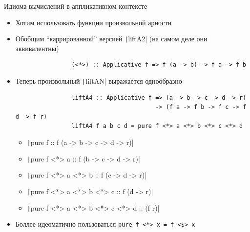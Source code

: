     \begin{frame}[fragile]{Идиома вычислений в аппликативном контексте}
        \vspace{-0.5em}
        \begin{itemize}
            \item Хотим использовать функции произвольной арности
            \item Обобщим ``каррированной'' версией \texttt|liftA2| (на самом деле они эквивалентны)
            \begin{verbatim}
                (<*>) :: Applicative f => f (a -> b) -> f a -> f b
            \end{verbatim}
            \item Теперь произвольный \texttt|liftAN| выражается однообразно
            \begin{verbatim}
                liftA4 :: Applicative f => (a -> b -> c -> d -> r)
                                        -> (f a -> f b -> f c -> f d -> f r)
                liftA4 f a b c d = pure f <*> a <*> b <*> c <*> d
            \end{verbatim}
            \begin{itemize}
                \item \texttt|pure f :: f (a -> b -> c -> d -> r)|
                \item \texttt|pure f <*> a :: f (b -> c -> d -> r)|
                \item \texttt|pure f <*> a <*> b :: f (c -> d -> r)|
                \item \texttt|pure f <*> a <*> b <*> c :: f (d -> r)|
                \item \texttt|pure f <*> a <*> b <*> c <*> d :: (f r)|
            \end{itemize}
            \item Боллее идеоматично пользоваться \texttt{pure f <*> x = f <\$> x}
        \end{itemize}
    \end{frame}

